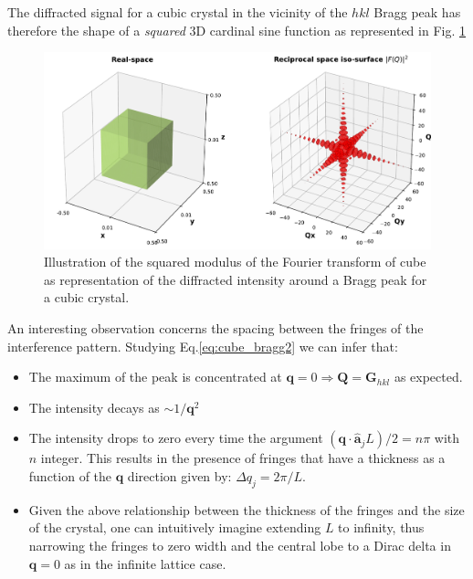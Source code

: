 The diffracted signal for a cubic crystal in the vicinity of the $hkl$ Bragg peak has therefore 
the shape of a \textit{squared} 3D cardinal sine function as represented in Fig. \ref{fig:cube}

\begin{figure}[H]
    \centering
    \includegraphics[width=\textwidth]{figures/Intro/cube1.pdf}
    \caption{Illustration of the squared modulus of the Fourier transform of cube as representation of the diffracted 
    intensity around a Bragg peak for a cubic crystal. }
    \label{fig:cube}
\end{figure}

An interesting observation concerns the spacing between the fringes of the interference pattern. Studying Eq.\ref{eq:cube_bragg2}
we can infer that:  

\begin{itemize}
    \item The maximum of the peak is concentrated at $\mathbf q = 0  \Rightarrow \mathbf Q = \mathbf{G}_{hkl}$ as expected. 
    \item The intensity decays as $ \sim 1/\mathbf{q}^2$
    \item The 
    intensity drops to zero every time the argument $(\mathbf{q} \cdot \mathbf{\hat{a}}_j L) /2 = n\pi$ with $n$ integer. 
    This results in the presence of fringes that have a thickness as a function of the $\mathbf q$ direction given by:
    $\Delta q_j = 2\pi/L$. 
    \item Given the above relationship between the thickness of the fringes and the size of the crystal, one can intuitively
    imagine extending $L$ to infinity, thus narrowing the fringes to zero width and the central lobe to a Dirac delta in $\mathbf{q} = 0$ 
    as in the infinite lattice case. 
\end{itemize}

